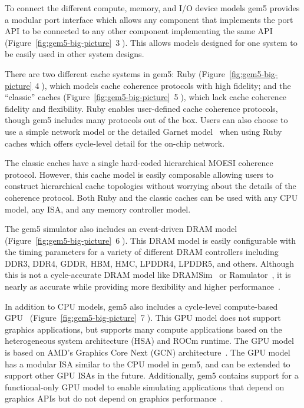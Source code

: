 To connect the different compute, memory, and I/O device models gem5 provides a modular port interface which allows any component that implements the port API to be connected to any other component implementing the same API (Figure~\ref{fig:gem5-big-picture}~\textcircled{3}).
This allows models designed for one system to be easily used in other system designs.

There are two different cache systems in gem5: Ruby (Figure~\ref{fig:gem5-big-picture} \textcircled{4}), which models cache coherence protocols with high fidelity; and the ``classic'' caches (Figure~\ref{fig:gem5-big-picture}~\textcircled{5}), which lack cache coherence fidelity and flexibility.
Ruby enables user-defined cache coherence protocols, though gem5 includes many protocols out of the box.
Users can also choose to use a simple network model or the detailed Garnet model~\cite{garnet-2} when using Ruby caches which offers cycle-level detail for the on-chip network.

The classic caches have a single hard-coded hierarchical MOESI coherence protocol.
However, this cache model is easily composable allowing users to construct hierarchical cache topologies without worrying about the details of the coherence protocol.
Both Ruby and the classic caches can be used with any CPU model, any ISA, and any memory controller model.

The gem5 simulator also includes an event-driven DRAM model (Figure~\ref{fig:gem5-big-picture}~\textcircled{6}).
This DRAM model is easily configurable with the timing parameters for a variety of different DRAM controllers including DDR3, DDR4, GDDR, HBM, HMC, LPDDR4, LPDDR5, and others.
Although this is not a cycle-accurate DRAM model like DRAMSim~\cite{wang_05, dramsim2, dramsim3} or Ramulator~\cite{yoongy_16}, it is nearly as accurate while providing more flexibility and higher performance~\cite{HanssonAgarwal2014-gem5DRAM}.

In addition to CPU models, gem5 also includes a cycle-level compute-based GPU~\cite{GutierrezBeckmann2018-amdAPU, Ta2019gputesting} (Figure~\ref{fig:gem5-big-picture}~\textcircled{7}).
This GPU model does not support graphics applications, but supports many compute applications based on the heterogeneous system architecture (HSA) and ROCm runtime.
The GPU model is based on AMD's Graphics Core Next (GCN) architecture~\cite{gcnWhitepaper, gcn3Manual}.
The GPU model has a modular ISA similar to the CPU model in gem5, and can be extended to support other GPU ISAs in the future. Additionally, gem5 contains support for a functional-only GPU model to enable simulating applications that depend on graphics APIs but do not depend on graphics performance~\cite{nomali}.

